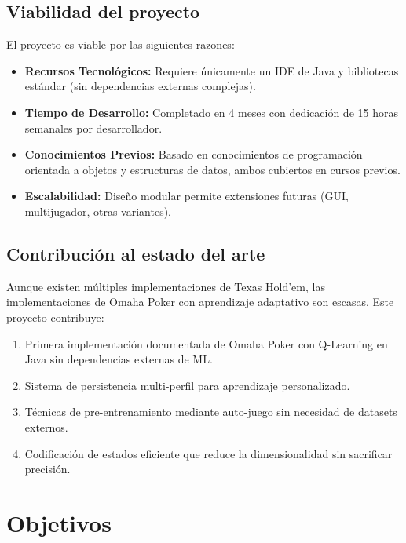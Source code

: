 \documentclass[12pt,a4paper]{article}
\begin{document}
\subsection{Viabilidad del proyecto}

El proyecto es viable por las siguientes razones:

\begin{itemize}
    \item \textbf{Recursos Tecnológicos:} Requiere únicamente un IDE de Java y bibliotecas estándar (sin dependencias externas complejas).
    \item \textbf{Tiempo de Desarrollo:} Completado en 4 meses con dedicación de 15 horas semanales por desarrollador.
    \item \textbf{Conocimientos Previos:} Basado en conocimientos de programación orientada a objetos y estructuras de datos, ambos cubiertos en cursos previos.
    \item \textbf{Escalabilidad:} Diseño modular permite extensiones futuras (GUI, multijugador, otras variantes).
\end{itemize}

\subsection{Contribución al estado del arte}

Aunque existen múltiples implementaciones de Texas Hold'em, las implementaciones de Omaha Poker con aprendizaje adaptativo son escasas. Este proyecto contribuye:

\begin{enumerate}
    \item Primera implementación documentada de Omaha Poker con Q-Learning en Java sin dependencias externas de ML.
    \item Sistema de persistencia multi-perfil para aprendizaje personalizado.
    \item Técnicas de pre-entrenamiento mediante auto-juego sin necesidad de datasets externos.
    \item Codificación de estados eficiente que reduce la dimensionalidad sin sacrificar precisión.
\end{enumerate}

\newpage

\section{Objetivos}
\end{document}
